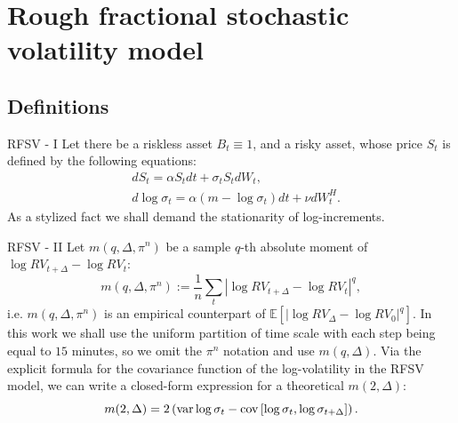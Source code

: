     \section{Rough fractional stochastic volatility model}
        \subsection{Definitions}
            \begin{frame}{RFSV - I}
                Let there be a riskless asset $B_t \equiv 1$, and a risky asset, whose price $S_t$ is defined 
                by the following equations: 
                \begin{align}
                    & dS_t          = \alpha S_t dt + \sigma_t S_tdW_t,               \label{model:RFSVasset} \\
                    & d\log\sigma_t = \alpha (m - \log\sigma_t) dt + \nu dW_t^H.      \label{model:RFSVvol}
                \end{align}
                As a stylized fact we shall demand the stationarity of log-increments.
            \end{frame}

            \begin{frame}{RFSV - II}
                Let $m(q, \Delta, \pi^n)$ be a sample $q$-th absolute moment of $\log RV_{t+\Delta} - \log RV_t$:
                \begin{equation}
                    m(q, \Delta, \pi^n) := \frac{1}{n} \sum_{t} \left|\log RV_{t + \Delta} - \log RV_t\right|^q,
                \end{equation}
                i.e. $m(q, \Delta, \pi^n)$ is an empirical counterpart of $\mathbb{E}\left[\left|\log RV_{\Delta} - \log RV_0\right|^q\right]$.
                In this work we shall use the uniform partition of time scale with each step being equal to $15$ minutes, so we omit the $\pi^n$ notation and use $m(q, \Delta)$.
                Via the explicit formula for the covariance function of the log-volatility in the RFSV model, we can write 
                a closed-form expression for a theoretical $m(2, \Delta)$:
                \begin{equation}
                    m(2, \Delta) = 2\left(\operatorname*{var} \log\sigma_{t} - \operatorname*{cov}\left[\log\sigma_{t}, \log\sigma_{t+\Delta}\right]\right).
                \end{equation}
            \end{frame}


